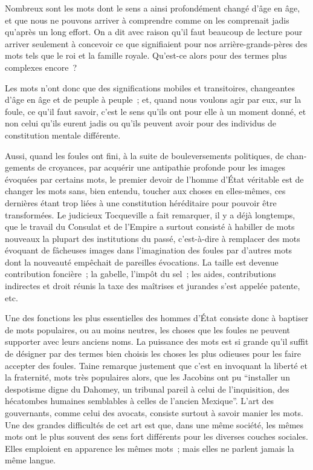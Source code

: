 \documentclass[french,twoside]{book} %
\begin{document}
Nombreux sont les mots dont le sens a ainsi profondément changé d’âge en âge, et que nous ne pouvons arriver à comprendre comme on les comprenait jadis qu’après un long effort. On a dit avec raison qu’il faut beaucoup de lecture pour arriver seulement à concevoir ce que signifiaient pour nos arrière-grands-pères des mots tels que le roi et la famille royale. Qu’est-ce alors pour des termes plus complexes encore ?\par
Les mots n’ont donc que des significations mobiles et transitoires, changeantes d’âge en âge et de peuple à peuple ; et, quand nous voulons agir par eux, sur la foule, ce qu’il faut savoir, c’est le sens qu’ils ont pour elle à un moment donné, et non celui qu’ils eurent jadis ou qu’ils peuvent avoir pour des individus de constitution mentale différente.\par
Aussi, quand les foules ont fini, à la suite de bouleversements politiques, de chan­gements de croyances, par acquérir une antipathie profonde pour les images évoquées par certains mots, le premier devoir de l’homme d’État véritable est de changer les mots sans, bien entendu, toucher aux choses en elles-mêmes, ces dernières étant trop liées à une constitution héréditaire pour pouvoir être transformées. Le judicieux Tocqueville a fait remarquer, il y a déjà longtemps, que le travail du Consulat et de l’Empire a surtout consisté à habiller de mots nouveaux la plupart des institutions du passé, c’est-à-dire à remplacer des mots évoquant de fâcheuses images dans l’imagi­nation des foules par d’autres mots dont la nouveauté empêchait de pareilles évoca­tions. La taille est devenue contribution foncière ; la gabelle, l’impôt du sel ; les aides, contributions indirectes et droit réunis la taxe des maîtrises et jurandes s’est appelée patente, etc.\par
Une des fonctions les plus essentielles des hommes d’État consiste donc à baptiser de mots populaires, ou au moins neutres, les choses que les foules ne peuvent supporter avec leurs anciens noms. La puissance des mots est si grande qu’il suffit de désigner par des termes bien choisis les choses les plus odieuses pour les faire accepter des foules. Taine remarque justement que c’est en invoquant la liberté et la fraternité, mots très populaires alors, que les Jacobins ont pu “installer un despotisme digne du Dahomey, un tribunal pareil à celui de l’inquisition, des hécatombes humai­nes semblables à celles de l’ancien Mexique”. L’art des gouvernants, comme celui des avocats, consiste surtout à savoir manier les mots. Une des grandes difficultés de cet art est que, dans une même société, les mêmes mots ont le plus souvent des sens fort différents pour les diverses couches sociales. Elles emploient en apparence les mêmes mots ; mais elles ne parlent jamais la même langue.\par
\end{document}
